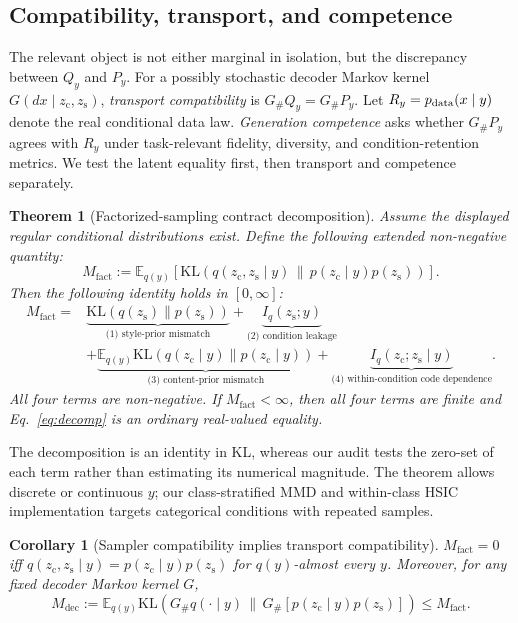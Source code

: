 \documentclass{article}
\newtheorem{theorem}{Theorem}
\newtheorem{corollary}{Corollary}
\newcommand{\zc}{z_{\mathrm{c}}}
\newcommand{\zs}{z_{\mathrm{s}}}
\newcommand{\KL}{\mathrm{KL}}
\begin{document}
\subsection{Compatibility, transport, and competence}

The relevant object is not either marginal in isolation, but the discrepancy
between $Q_y$ and $P_y$.  For a possibly stochastic decoder Markov kernel
$G(dx\mid\zc,\zs)$, \emph{transport compatibility} is
$G_\#Q_y=G_\#P_y$.  Let $R_y=p_{\rm data}(x\mid y)$ denote the real conditional
data law.  \emph{Generation competence} asks whether $G_\#P_y$ agrees with
$R_y$ under task-relevant fidelity, diversity, and condition-retention metrics.
We test the latent equality first, then transport and competence separately.

\begin{theorem}[Factorized-sampling contract decomposition]
\label{thm:decomp}
Assume the displayed regular conditional distributions exist.  Define the
following extended non-negative quantity:
\begin{equation}
M_{\mathrm{fact}}:=\mathbb E_{q(y)}\!\left[
\KL\!\left(q(\zc,\zs\mid y)\,\|\,p(\zc\mid y)p(\zs)\right)\right].
\end{equation}
Then the following identity holds in $[0,\infty]$:
\begin{align}
M_{\mathrm{fact}}={}&
\underbrace{\KL(q(\zs)\|p(\zs))}_{\text{(1) style-prior mismatch}}
+\underbrace{I_q(\zs;y)}_{\text{(2) condition leakage}}\nonumber\\
&+\underbrace{\mathbb E_{q(y)}\KL(q(\zc\mid y)\|p(\zc\mid y))}_{\text{(3) content-prior mismatch}}
+\underbrace{I_q(\zc;\zs\mid y)}_{\text{(4) within-condition code dependence}}.
\label{eq:decomp}
\end{align}
All four terms are non-negative.  If $M_{\mathrm{fact}}<\infty$, then all four
terms are finite and Eq.~\ref{eq:decomp} is an ordinary real-valued equality.
\end{theorem}

The decomposition is an identity in KL, whereas our audit tests the zero-set
of each term rather than estimating its numerical magnitude.  The theorem
allows discrete or continuous $y$; our class-stratified MMD and within-class
HSIC implementation targets categorical conditions with repeated samples.

\begin{corollary}[Sampler compatibility implies transport compatibility]
\label{cor:valid}
$M_{\mathrm{fact}}=0$ iff
$q(\zc,\zs\mid y)=p(\zc\mid y)p(\zs)$ for $q(y)$-almost every $y$.
Moreover, for any fixed decoder Markov kernel $G$,
\begin{equation}
M_{\mathrm{dec}}:=\mathbb E_{q(y)}\KL\!\left(G_\#q(\cdot\mid y)\,\|\,
G_\#[p(\zc\mid y)p(\zs)]\right)\le M_{\mathrm{fact}}.
\end{equation}
\end{corollary}
\end{document}
